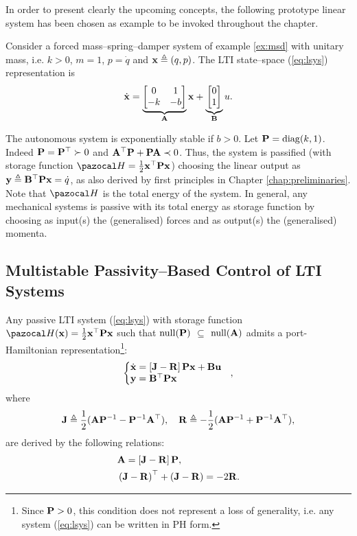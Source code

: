 %
In order to present clearly the upcoming concepts, the following prototype linear system has been chosen as example to be invoked throughout the chapter.
%
\begin{exmp}\label{ex:msd_MES}
    Consider a forced mass--spring--damper system of example \ref{ex:msd} with unitary mass, i.e. $k>0$, $m = 1$, $p = \dot{q}$ and $\mathbf{x}\triangleq (q,p)$.
    The LTI state--space (\ref{eq:lsys}) representation is
    \begin{equation}
        \dot{\mathbf{x}} = \underbrace{\begin{bmatrix}0&1\\-k&-b\end{bmatrix}}_{\mathbf{A}}\mathbf{x}+ \underbrace{\begin{bmatrix}0\\1\end{bmatrix}}_{\mathbf{B}}u.
    \end{equation}
    
    The autonomous system is exponentially stable if $b>0$. Let $\mathbf{P}=\operatorname{diag}({k,1})$. Indeed $\mathbf{P}=\mathbf{P}^\top\succ0$ and $\mathbf{A}^\top\mathbf{P}+\mathbf{P}\mathbf{A}\prec0$. Thus, the system is passified (with storage function $\Ha = \frac{1}{2}\xb^\top \Pb\xb$) choosing the linear output as $\mathbf{y} \triangleq \mathbf{B}^\top \mathbf{P}\mathbf{x} = \dot{q}$, as also derived by first principles in Chapter \ref{chap:preliminaries}. Note that $\Ha$ is the total energy of the system. In general, any mechanical systems is passive with its total energy as storage function by choosing as input(s) the (generalised) forces and as output(s) the (generalised) momenta.
\end{exmp}
%
\subsection{Multistable Passivity--Based Control of LTI Systems}
%
Any passive LTI system (\ref{eq:lsys}) with storage function $\Ha(\xb) = \frac{1}{2}\xb^\top \Pb\xb$ such that $\operatorname{null}(\mathbf{P})$ $\subseteq$ $\operatorname{null}(\mathbf{A})$ admits a port-Hamiltonian representation\footnote{Since $\mathbf{P}>0$, this condition does not represent a loss of generality, i.e. any system (\ref{eq:lsys}) can be written in PH form.}:
%
\begin{equation}
    \left\{
    \begin{matrix*}[l]
    \dot{\xb} = \left[\Jb-\Rb\right]\Pb\xb + \Bb\ub\\
    \yb = \Bb^\top \Pb\xb
    \end{matrix*}
    \right.~~,
\end{equation}
%
where 
%
\begin{equation}
    \mathbf{J} \triangleq \frac{1}{2}(\mathbf{A}\mathbf{P}^{-1}-\mathbf{P}^{-1}\mathbf{A}^\top),\quad\mathbf{R} \triangleq- \frac{1}{2}(\mathbf{A}\mathbf{P}^{-1}+\mathbf{P}^{-1}\mathbf{A}^\top),
\end{equation}
% 
are derived by the following relations:
%
\begin{align}
    & \mathbf{A} = \left[\mathbf{J}-\mathbf{R}\right]\mathbf{P},\\
    & \left(\mathbf{J}-\mathbf{R}\right)^\top + \left(\mathbf{J}-\mathbf{R}\right) = -2\mathbf{R}.
\end{align}
%

